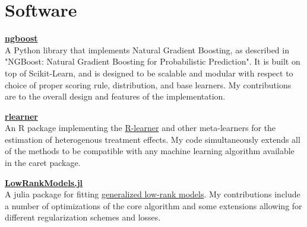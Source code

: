 \section{\mysidestyle Software}

\href{https://github.com/stanfordmlgroup/ngboost}{\textbf{ngboost}}\\
A Python library that implements Natural Gradient Boosting, as described in "NGBoost: Natural Gradient Boosting for Probabilistic Prediction". It is built on top of Scikit-Learn, and is designed to be scalable and modular with respect to choice of proper scoring rule, distribution, and base learners. My contributions are to the overall design and features of the implementation. 

\href{https://github.com/xnie/rlearner/commits?author=alejandroschuler}{\textbf{rlearner}}\\
An R package implementing the \href{https://arxiv.org/pdf/1712.04912.pdf}{R-learner} and other meta-learners for the estimation of heterogenous treatment effects. My code simultaneously extends all of the methods to be compatible with any machine learning algorithm available in the caret package.

\href{https://github.com/madeleineudell/LowRankModels.jl/commits?author=alejandroschuler}{\textbf{LowRankModels.jl}}\\
A julia package for fitting \href{https://arxiv.org/abs/1410.0342}{generalized low-rank models}. My contributions include a number of optimizations of the core algorithm and some extensions allowing for different regularization schemes and losses.